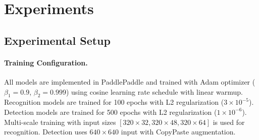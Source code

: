 \documentclass[11pt, a4paper,logo,  copyright, nonumbering]{paddleocr}
\begin{document}


\section{Experiments}
\subsection{Experimental Setup}
\label{sec:setup}

\paragraph{Training Configuration.}
All models are implemented in PaddlePaddle and trained with Adam optimizer ($\beta_1=0.9$, $\beta_2=0.999$) using cosine learning rate schedule with linear warmup. Recognition models are trained for 100 epochs with L2 regularization ($3\times10^{-5}$). Detection models are trained for 500 epochs with L2 regularization ($1\times10^{-6}$). Multi-scale training with input sizes $[320\times32, 320\times48, 320\times64]$ is used for recognition. Detection uses $640\times640$ input with CopyPaste augmentation.
\end{document}
